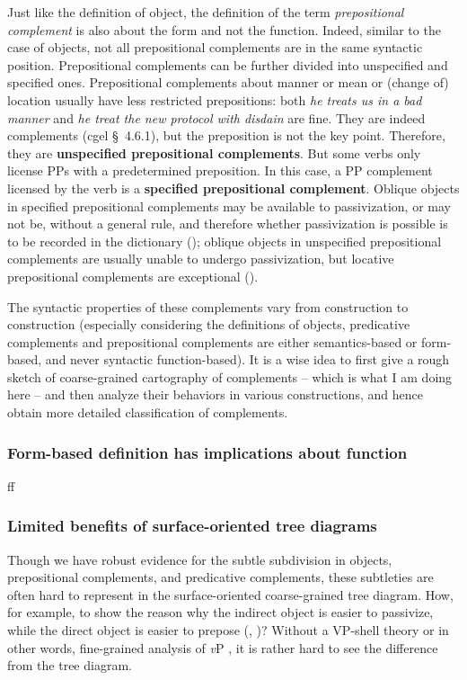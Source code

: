 \documentclass{article}
\newcommand*{\citesec}[1]{\S~{#1}}
\newcommand*{\concept}[1]{\textbf{#1}}
\newcommand*{\term}[1]{\emph{#1}}
\newcommand*{\corpus}[1]{\emph{#1}}
\newcommand*{\vP}{\textit{v}P}
\begin{document}
Just like the definition of object, 
the definition of the term \term{prepositional complement} is also about the form and not the function.
Indeed, similar to the case of objects,
not all prepositional complements are in the same syntactic position.
Prepositional complements can be further divided into unspecified and specified ones.
Prepositional complements about manner or mean or (change of) location usually have less restricted prepositions:
both \corpus{he treats us in a bad manner} and \corpus{he treat the new protocol with disdain} are fine.
They are indeed complements (\ac{cgel} \citesec{4.6.1}),
but the preposition is not the key point.
Therefore, they are \concept{unspecified prepositional complements}.
But some verbs only license PPs with a predetermined preposition.
In this case, a PP complement licensed by the verb is a \concept{specified prepositional complement}.
Oblique objects in specified prepositional complements may be available to passivization, 
or may not be, without a general rule, 
and therefore whether passivization is possible is to be recorded in the dictionary ();
oblique objects in unspecified prepositional complements are usually unable to undergo passivization,
but locative prepositional complements are exceptional ().

The syntactic properties of these complements vary from construction to construction
(especially considering the definitions of objects, predicative complements and prepositional complements 
are either semantics-based or form-based, and never syntactic function-based).
It is a wise idea to first give a rough sketch of coarse-grained cartography of complements
-- which is what I am doing here --
and then analyze their behaviors in various constructions, 
and hence obtain more detailed classification of complements.

\subsubsection{Form-based definition has implications about function}\label{sec:complement-form-function}

ff

\subsubsection{Limited benefits of surface-oriented tree diagrams}

Though we have robust evidence for the subtle subdivision 
in objects, prepositional complements, and predicative complements, 
these subtleties are often hard to represent in the surface-oriented coarse-grained tree diagram.
How, for example, to show the reason 
why the indirect object is easier to passivize,
while the direct object is easier to prepose 
(, )?
Without a VP-shell theory or in other words, fine-grained analysis of \vP{} \citep{harley2017syntax},
it is rather hard to see the difference from the tree diagram.
\end{document}
